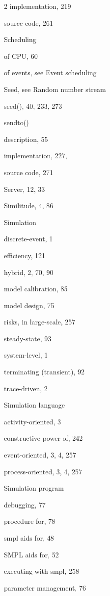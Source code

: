 \begin{multicols}{2}
\quad implementation, 219\par
\quad source code, 261\par
\noindent Scheduling\par
\quad of CPU, 60\par
\quad of events, see Event scheduling\par
\noindent Seed, see Random number stream\par
\noindent seed(), 40, 233, 273\par
\noindent sendto()\par
\quad description, 55\par
\quad implementation, 227,\par
\quad source code, 271\par
\noindent Server, 12, 33\par
\noindent Similitude, 4, 86\par
\noindent Simulation\par
\quad discrete-event, 1\par
\quad efficiency, 121\par
\quad hybrid, 2, 70, 90\par
\quad model calibration, 85\par
\quad model design, 75\par
\quad risks, in large-scale, 257\par
\quad steady-state, 93\par
\quad system-level, 1\par
\quad terminating (transient), 92\par
\quad trace-driven, 2\par
\noindent Simulation language\par
\quad activity-oriented, 3\par
\quad constructive power of, 242\par
\quad event-oriented, 3, 4, 257\par
\quad process-oriented, 3, 4, 257\par
\noindent Simulation program\par
\quad debugging, 77\par
\qquad procedure for, 78\par
\qquad smpl aids for, 48\par
\qquad SMPL aids for, 52\par
\quad executing with smpl, 258\par
\quad parameter management, 76\par

\end{multicols}
